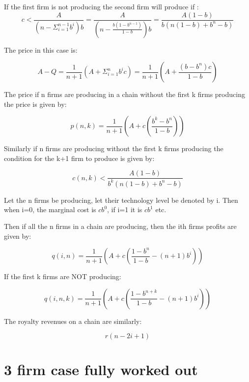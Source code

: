 \documentclass{article}
\begin{document}
If the first firm is not producing the second firm will produce if : 
\begin{equation*}
c< \frac{A}{(n-\Sigma^{n-1}_{i=1}b^i)b} 
= \frac{A}{(n-\frac{b(1-b^{n-1})}{1-b})b}
=\frac{A(1-b)}{b(n(1-b)+b^{n}-b)}
\end{equation*}

The price in this case is:

\begin{equation*}
A-Q= \frac{1}{n+1} \left( 
A+\Sigma^n_{i=1}b^i c
\right) 
= \frac{1}{n+1}\left(A+\frac{(b-b^{n})c}{1-b} \right)
\end{equation*}

The price if n firms are producing in a chain without the first k firms producing the price is given by:

\begin{equation*}
p(n,k)=\frac{1}{n+1}\left(
A+ c \left(
\frac{b^k-b^n}{1-b}
\right)
\right)
\end{equation*}

Similarly if n firms are producing without the first k firms producing the condition for the k+1 firm to produce is given by:

\begin{equation*}
c(n,k)< \frac{A(1-b)}{b^k(n(1-b)+b^n-b)}
\end{equation*}

Let the n firms be producing, let their technology level be denoted by i. Then when i=0, the marginal cost is $cb^0$, if i=1 it is $cb^1$ etc. 

Then if all the n firms in a chain are producing, then the ith firms profits are given by:

\begin{equation*}
q(i,n) = \frac{1}{n+1} \left( 
A+c\left(\frac{1-b^n}{1-b}-(n+1)b^i\right)
\right)
\end{equation*}

If the first k firms are NOT producing: 

\begin{equation*}
q(i,n,k) = \frac{1}{n+1} \left( 
A+c\left(\frac{1-b^{n+k}}{1-b}-(n+1)b^i\right)
\right)
\end{equation*}

The royalty revenues on a chain are similarly: 

\begin{equation*}
r(n-2i+1)
\end{equation*}


\section{3 firm case fully worked out}
\end{document}
